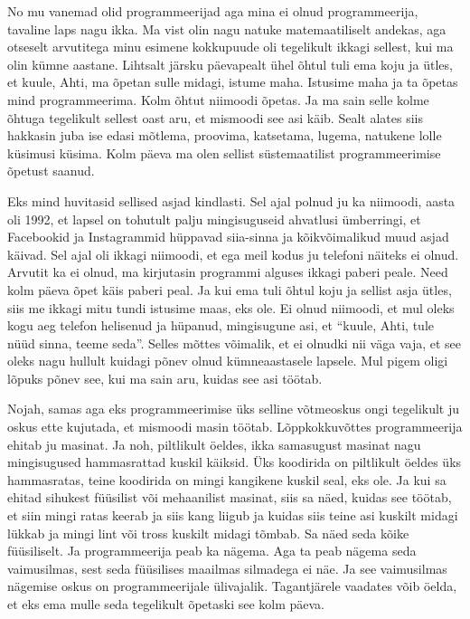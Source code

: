 
No mu vanemad olid programmeerijad aga mina ei olnud programmeerija, tavaline 
laps nagu ikka. Ma vist olin nagu natuke  matemaatiliselt  andekas, aga 
otseselt arvutitega minu  esimene kokkupuude oli tegelikult ikkagi sellest, kui 
ma olin kümne aastane. Lihtsalt järsku päevapealt  ühel õhtul tuli ema  koju ja 
ütles, et kuule, Ahti,  ma õpetan sulle midagi, istume maha. Istusime maha ja 
ta õpetas mind programmeerima. Kolm õhtut niimoodi õpetas. Ja ma sain selle 
kolme õhtuga tegelikult sellest oast aru, et mismoodi see asi käib. Sealt 
alates  siis hakkasin juba ise edasi mõtlema, proovima, katsetama, lugema, 
natukene lolle küsimusi küsima. Kolm päeva ma olen sellist süstemaatilist 
programmeerimise õpetust saanud.


Eks mind huvitasid sellised asjad kindlasti. Sel ajal polnud ju ka niimoodi,  
aasta oli 1992, et  lapsel on tohutult palju mingisuguseid ahvatlusi 
ümberringi, et Facebookid ja Instagrammid hüppavad siia-sinna ja kõikvõimalikud 
muud asjad käivad. Sel ajal oli ikkagi niimoodi, et ega meil kodus ju telefoni 
näiteks ei olnud. Arvutit ka ei olnud, ma kirjutasin programmi  
alguses ikkagi paberi peale. Need kolm päeva õpet käis paberi 
peal. Ja kui  ema tuli õhtul koju ja sellist asja ütles, siis me ikkagi mitu 
tundi istusime maas, eks ole. Ei olnud niimoodi, et mul oleks kogu aeg telefon 
helisenud ja hüpanud, mingisugune asi, et \enquote{kuule, Ahti, tule nüüd sinna, teeme 
seda}. Selles mõttes võimalik, et ei olnudki nii väga vaja, et see oleks nagu 
hullult kuidagi põnev olnud kümneaastasele lapsele. Mul pigem oligi lõpuks  
põnev see, kui ma sain aru, kuidas see asi töötab.


Nojah, samas aga eks programmeerimise üks selline  võtmeoskus ongi tegelikult 
ju oskus ette kujutada, et mismoodi  masin  töötab. Lõppkokkuvõttes  
programmeerija ehitab ju masinat. Ja noh, piltlikult öeldes, ikka samasugust 
masinat nagu  mingisugused hammasrattad kuskil käiksid. Üks koodirida on 
piltlikult öeldes üks hammasratas, teine koodirida on mingi kangikene 
kuskil seal, eks ole. Ja kui sa ehitad sihukest füüsilist või mehaanilist 
masinat, siis sa näed, kuidas see töötab, et siin mingi ratas keerab 
ja siis kang liigub ja kuidas siis teine asi kuskilt midagi lükkab ja mingi 
lint või tross kuskilt midagi tõmbab. Sa näed seda kõike füüsiliselt. Ja 
programmeerija peab ka nägema. Aga ta peab nägema seda vaimusilmas, sest seda  
füüsilises maailmas  silmadega ei näe. Ja see vaimusilmas nägemise oskus on 
programmeerijale ülivajalik. Tagantjärele vaadates võib öelda, et eks ema mulle 
seda tegelikult õpetaski see kolm päeva.

